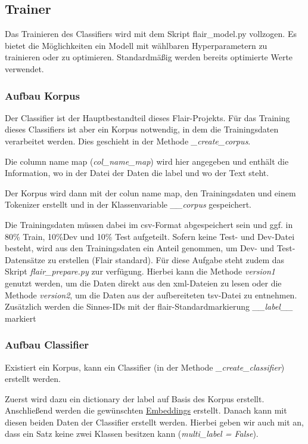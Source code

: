 \documentclass[10pt,a4paper]{article}
\begin{document}
\subsection{Trainer}

\begin{flushleft}
Das Trainieren des Classifiers wird mit dem Skript flair\_model.py vollzogen. Es bietet die Möglichkeiten ein Modell mit wählbaren Hyperparametern zu trainieren oder zu optimieren. Standardmäßig werden bereits optimierte Werte verwendet.
\end{flushleft}

\subsubsection{Aufbau Korpus}
\begin{flushleft}
Der Classifier ist der Hauptbestandteil dieses Flair-Projekts. Für das Training dieses Classifiers ist aber ein Korpus notwendig, in dem die Trainingsdaten verarbeitet werden. Dies geschieht in der Methode \textit{\_create\_corpus}.

Die column name map (\textit{col\_name\_map}) wird hier angegeben und enthält die Information, wo in der Datei der Daten die label und wo der Text steht.

Der Korpus wird dann mit der colun name map, den Trainingsdaten und einem Tokenizer erstellt und in der Klassenvariable \textit{\_\_corpus} gespeichert.

Die Trainingsdaten müssen dabei im csv-Format abgespeichert sein und ggf. in 80\% Train, 10\%Dev und 10\% Test aufgeteilt. Sofern keine Test- und Dev-Datei besteht, wird aus den Trainingsdaten ein Anteil genommen, um Dev- und Test-Datensätze zu erstellen (Flair standard). Für diese Aufgabe steht zudem das Skript \textit{flair\_prepare.py} zur verfügung. Hierbei kann die Methode \textit{version1} genutzt werden, um die Daten direkt aus den xml-Dateien zu lesen oder die Methode \textit{version2}, um die Daten aus der aufbereiteten tsv-Datei zu entnehmen. Zusätzlich werden die Sinnes-IDs mit der flair-Standardmarkierung \textit{\_\_label\_\_} markiert
\end{flushleft}

\subsubsection{Aufbau Classifier}
\begin{flushleft}
Existiert ein Korpus, kann ein Classifier (in der Methode \textit{\_create\_classifier}) erstellt werden.

Zuerst wird dazu ein dictionary der label auf Basis des Korpus erstellt. Anschließend werden die gewünschten \hyperlink{Embed}{Embeddings} erstellt. Danach kann mit diesen beiden Daten der Classifier erstellt werden. Hierbei geben wir auch mit an, dass ein Satz keine zwei Klassen besitzen kann (\textit{multi\_label = False}).
\end{flushleft}
\end{document}
